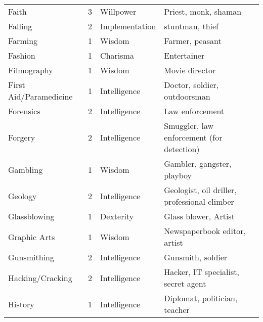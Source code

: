 \documentclass[twoside]{book}
\begin{document}
\begin{longtable}{p{1.25in}llp{12em}}
  \raggedright
           Faith 
  &
   3 
  &
   Willpower 
  &
   Priest, monk, shaman
           
  \tabularnewline
      
  \raggedright
           Falling 
  &
   2 
  &
   Implementation 
  &
   stuntman, thief 
  \tabularnewline
      
  \raggedright
           Farming 
  &
   1 
  &
   Wisdom 
  &
   Farmer, peasant 
  \tabularnewline
      
  \raggedright
           Fashion 
  &
   1 
  &
   Charisma 
  &
   Entertainer 
  \tabularnewline
      
  \raggedright
           Filmography 
  &
   1 
  &
   Wisdom 
  &
   Movie director 
  \tabularnewline
      
  \raggedright
           First Aid/Paramedicine 
  &
   1 
  &
   Intelligence 
  &
   Doctor, soldier,
           outdoorsman 
  \tabularnewline
      
  \raggedright
           Forensics 
  &
   2 
  &
   Intelligence 
  &
   Law enforcement 
  \tabularnewline
      
  \raggedright
           Forgery 
  &
   2 
  &
   Intelligence 
  &
   Smuggler, law enforcement
           (for detection) 
  \tabularnewline
      
  \raggedright
           Gambling 
  &
   1 
  &
   Wisdom 
  &
   Gambler, gangster,
           playboy 
  \tabularnewline
      
  \raggedright
           Geology 
  &
   2 
  &
   Intelligence 
  &
   Geologist, oil driller,
           professional climber 
  \tabularnewline
      
  \raggedright
           Glassblowing 
  &
   1 
  &
   Dexterity 
  &
   Glass blower, Artist
           
  \tabularnewline
      
  \raggedright
           Graphic Arts 
  &
   1 
  &
   Wisdom 
  &
   Newspaperbook
           editor, artist 
  \tabularnewline
      
  \raggedright
           Gunsmithing 
  &
   2 
  &
   Intelligence 
  &
   Gunsmith, soldier
           
  \tabularnewline
      
  \raggedright
           Hacking/Cracking 
  &
   2 
  &
   Intelligence 
  &
   Hacker, IT specialist,
           secret agent 
  \tabularnewline
      
  \raggedright
           History 
  &
   1 
  &
   Intelligence 
  &
   Diplomat, politician,
           teacher 
  \tabularnewline
      

\end{longtable}
\end{document}
